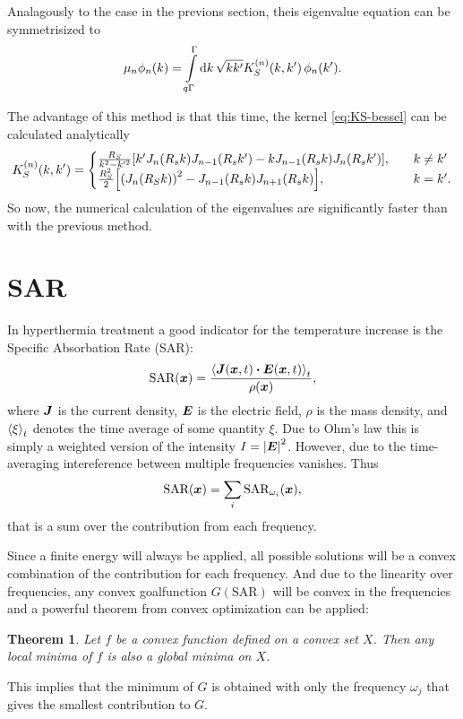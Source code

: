 \documentclass[11pt,a4paper, 
swedish,english %
]{article}
\begin{document}
Analagously to the case in the previons section, theis eigenvalue
equation can be symmetrisized to
\begin{equation}
\mu_n\phi_n(k) = \int_{q\Gamma}^{\Gamma}\rd{k}\,
\sqrt{kk'} K_S^{(n)}(k, k')\,\phi_n(k').
\end{equation}

The advantage of this method is that this time, the kernel
\eqref{eq:KS-bessel} can be calculated analytically
\cite[Formula 5.54]{Gradshteyn-Ryzhik}
\begin{equation}
K_S^{(n)}(k, k') =
\begin{cases}
\frac{R_S}{k^2-k'^2}
\qty[k'J_{n}(R_sk)J_{n-1}(R_sk')-kJ_{n-1}(R_sk)J_{n}(R_sk')]
\qc &k\neq k'\\
\frac{R_S^2}{2}\qty[ \qty(J_{n}(R_Sk))^2
-J_{n-1}(R_sk)J_{n+1}(R_sk)]
\qc &k= k'.
\end{cases}
\end{equation}
So now, the numerical calculation of the eigenvalues are significantly
faster than with the previous method.

\section{SAR}

\newtheorem{theorem}{Theorem}
In hyperthermia treatment a good indicator for the temperature
increase is the Specific Absorbation Rate (SAR): 
\begin{equation*}
\text{SAR}(\vb*x)=
\frac{\ev{\vb*J(\vb*x,t)\vdot \vb*E(\vb*x,t)}_t}{\rho(\vb*x)},
\end{equation*}
where $\vb*J$ is the current density, $\vb*E$ is the
electric field, $\rho$ is the mass density, and $\ev{\xi}_t$ denotes
the time average of some quantity $\xi$.
Due to Ohm's law this is simply a weighted version of the intensity
$I=\abs{\vb*E}^2$.
However, due to the time-averaging intereference between multiple
frequencies vanishes. Thus
\begin{equation}
\text{SAR}(\vb*x)=\sum_i\text{SAR}_{\omega_i}(\vb*x),
\end{equation}
that is a sum over the contribution from each frequency.

Since a finite energy will always be applied, all possible solutions
will be a convex combination of the contribution for each
frequency. And due to the linearity over frequencies, any convex
goalfunction $G(\text{SAR})$ will be convex in the frequencies and a
powerful theorem from convex optimization can be applied: 
\begin{theorem}
 Let $f$ be a convex function defined on a convex set $X$. Then any
 local minima of $f$ is also a global minima on $X$. 
\end{theorem}
This implies that the minimum of $G$ is obtained with only the
frequency $\omega_j$ that gives the smallest contribution to $G$. 
\end{document}
